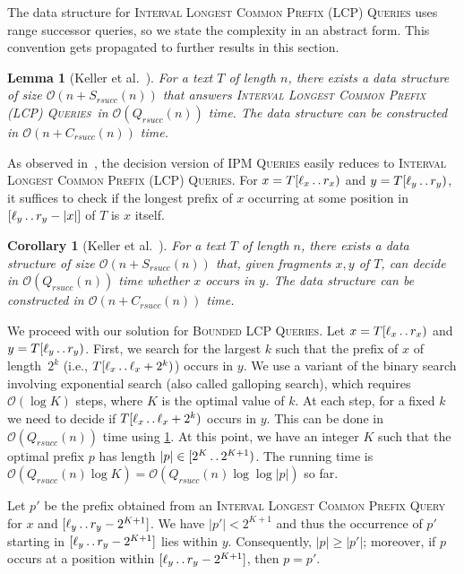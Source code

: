 \documentclass[a4paper]{article}
\newtheorem{lemma}[theorem]{Lemma}
\newtheorem{corollary}[theorem]{Corollary}
\theoremstyle{definition}
\theoremstyle{remark}
\newcommand{\IPM}{\textsc{IPM Queries}\xspace}
\newcommand{\BLCP}{\textsc{Bounded LCP Queries}\xspace}
\newcommand{\ILCP}{\textsc{Interval Longest Common Prefix (LCP) Queries}\xspace}
\newcommand{\dd}{\mathinner{\ldotp\ldotp}}
\newcommand{\Oh}{\mathcal{O}}
\newcommand{\rsucc}{\mathit{rsucc}}
\begin{document}
The data structure for \ILCP uses range successor queries, so we state the complexity in an abstract form.
This convention gets propagated to further results in this section.

\begin{lemma}[Keller et al.~\cite{DBLP:journals/tcs/KellerKFL14}]\label{lem:app-ilcp}
For a text $T$ of length $n$, there exists a data structure of size $\Oh(n+S_{\rsucc}(n))$ that answers \ILCP\ in $\Oh(Q_{\rsucc}(n))$ time.
The data structure can be constructed in $\Oh(n+C_{\rsucc}(n))$ time.
\end{lemma}

As observed in~\cite{DBLP:journals/tcs/KellerKFL14}, the decision version of \IPM easily reduces to \ILCP. For $x=T[\ell_x\dd r_x)$
and $y=T[\ell_y\dd r_y)$, it suffices to check if the longest prefix of $x$ occurring at some position in $[\ell_y\dd r_y-|x|]$ of $T$ is $x$ itself.\begin{corollary}[Keller et al.~\cite{DBLP:journals/tcs/KellerKFL14}]\label{lem:any}
For a text $T$ of length $n$, there exists a data structure of size $\Oh(n+S_{\rsucc}(n))$ that, given fragments $x,y$ of $T$, can decide in $\Oh(Q_{\rsucc}(n))$ time whether $x$ occurs in $y$.
The data structure can be constructed in $\Oh(n+C_{\rsucc}(n))$ time.
\end{corollary}

We proceed with our solution for \BLCP.
Let $x = T[\ell_x\dd r_x)$ and $y = T[\ell_y\dd r_y)$.
First, we search for the largest $k$ such that the prefix of $x$ of length~$2^k$ (i.e., $T[\ell_x\dd \ell_x+2^k)$) occurs in $y$.
We use a variant of the binary search involving exponential search (also called galloping search),
which requires $\Oh(\log K)$ steps, where $K$ is the optimal value of $k$.
At each step, for a fixed $k$ we need to decide if $T[\ell_x\dd \ell_x+2^k)$ occurs in $y$.
This can be done in $\Oh(Q_{\rsucc}(n))$ time using \cref{lem:any}.
At this point, we have an integer $K$ such that the optimal prefix $p$ has length $|p|\in [2^K\dd 2^{K+1})$.
The running time is $\Oh(Q_{\rsucc}(n) \log K) = \Oh(Q_{\rsucc}(n) \log\log |p|)$ so far.

Let $p'$ be the prefix obtained from an \textsc{Interval Longest Common Prefix Query} for $x$ and $[\ell_y\dd r_y-2^{K+1}]$.
We have $|p'|<2^{K+1}$ and thus the occurrence of $p'$ starting in $[\ell_y\dd r_y-2^{K+1}]$ lies within $y$.
Consequently, $|p|\ge |p'|$; moreover, if $p$ occurs at a position within $[\ell_y\dd r_y-2^{K+1}]$,
then $p=p'$.
\end{document}
